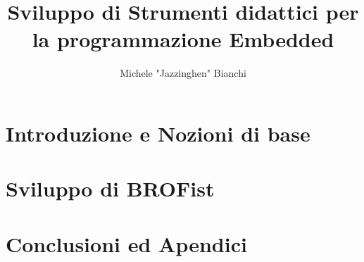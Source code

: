 \documentclass[10pt,a4paper,cleardoubleempty]{scrbook}
\author{Michele "Jazzinghen" Bianchi}
\title{Sviluppo di Strumenti didattici per la programmazione Embedded}
\begin{document}
    \tableofcontents
    \cleardoublepage
    
    
    
    \part{Introduzione e Nozioni di base}
    
    
    

    \part{Sviluppo di BROFist}

    

    \part{Conclusioni ed Apendici}
    
    
\end{document}
